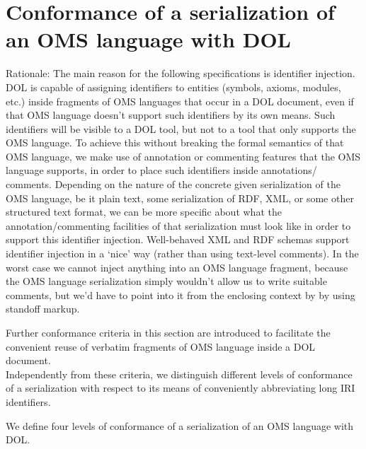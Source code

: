 \documentclass[10pt,fleqn,%
\ifpretendfinal
final%
\else
draft%
\fi,
]{scrreprt}
\newcommand*{\termref}[1]{\index{#1}#1\xspace}
\newcommand{\sclause}[1]{\section{#1}}
\begin{document}
\sclause{Conformance of a serialization of an OMS language with DOL}\label{c:conform:serialization}

Rationale: The main reason for the following specifications is identifier injection. DOL is capable
of assigning identifiers to entities (symbols, axioms, modules, etc.) inside fragments of OMS
languages that occur in a DOL document, even if that OMS language doesn't support such identifiers
by its own means. 
Such identifiers will be visible to a DOL tool, but not to a tool that only supports the OMS
language.  To achieve this without breaking the formal semantics of that OMS language, we make use
of \termref{annotation} or commenting features that the OMS language supports, in order to place such
identifiers inside annotations/ comments.  Depending on the nature of the concrete given
serialization of the OMS language, be it plain text, some serialization of RDF, XML, or some other 
structured text format, we can be more specific about what the annotation/commenting facilities of
that serialization must look like in order to support this identifier injection.  
Well-behaved XML and RDF schemas support identifier injection in a `nice' way (rather than using
text-level comments).   In the worst case we cannot 
inject anything into an OMS language fragment, because the OMS language serialization simply
wouldn't allow us to write suitable comments, but we'd have to point into it from the enclosing context by
by using \termref{standoff markup}.


Further conformance criteria in this section are introduced to facilitate the convenient reuse of
verbatim fragments of OMS language inside a DOL document.\\
Independently from these criteria, we distinguish different levels of conformance of a
serialization with respect to its means of conveniently abbreviating long IRI identifiers.


We define four levels of conformance of a serialization of an OMS language with DOL.
\end{document}
